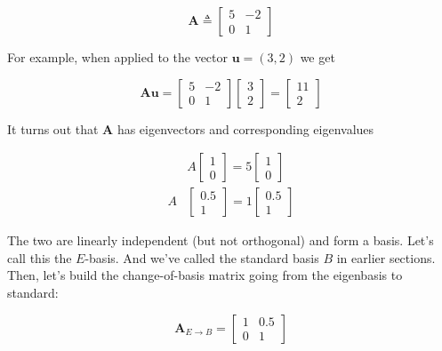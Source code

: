 \documentclass[main.tex]{subfiles}
\begin{document}
    $$
    \mathbf{A} \triangleq\left[\begin{array}{cc}
    5 & -2 \\
    0 & 1
    \end{array}\right]
    $$
    
    For example, when applied to the vector $\mathbf{u}=(3,2)$ we get 
    
    $$
    \mathbf{A} \mathbf{u}=\left[\begin{array}{cc}
    5 & -2 \\
    0 & 1
    \end{array}\right]\left[\begin{array}{l}
    3 \\
    2
    \end{array}\right]=\left[\begin{array}{r}
    11 \\
    2
    \end{array}\right]
    $$
    
    It turns out that $\mathbf{A}$ has eigenvectors and corresponding eigenvalues
    
    $$
    \begin{aligned}
    & A\left[\begin{array}{l}
    1 \\
    0
    \end{array}\right]=5\left[\begin{array}{l}
    1 \\
    0
    \end{array}\right] \\
    A &\left[\begin{array}{r}
    0.5 \\
    1
    \end{array}\right]=1\left[\begin{array}{r}
    0.5 \\
    1
    \end{array}\right]
    \end{aligned}
    $$

    The two are linearly independent (but not orthogonal) and form a basis. Let's call this the $E$-basis. And we've called the standard basis $B$ in earlier sections. Then, let's build the change-of-basis matrix going from the eigenbasis to standard: 
    
    $$
    \mathbf{A}_{E \rightarrow B}=\left[\begin{array}{cc}
    1 & 0.5 \\
    0 & 1
    \end{array}\right]
    $$
    
\end{document}
